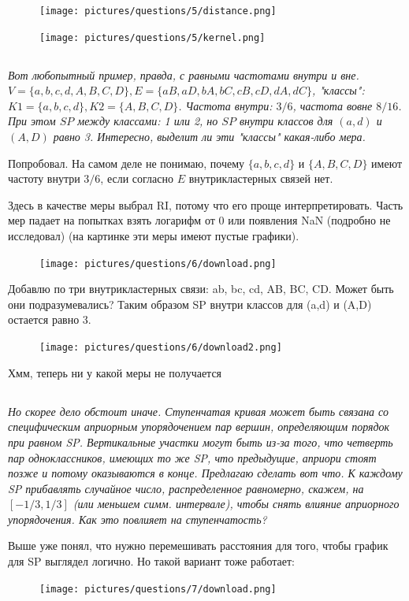 \documentclass{article}
\begin{document}
\begin{figure}[H] %
	\begin{minipage}{.5\textwidth}
		\centerline{
			\texttt{[image: pictures/questions/5/distance.png]}
		}
	\end{minipage}%
	\begin{minipage}{.5\textwidth}
		\centerline{
			\texttt{[image: pictures/questions/5/kernel.png]}
		}
	\end{minipage}%
\end{figure}

\subsection{}
\textit{Вот любопытный пример, правда, с равными частотами внутри и вне.  $V = \{a, b, c, d, A, B, C, D\}, E = \{aB, aD, bA, bC, cB, cD, dA, dC\}$, "классы": $K1 = \{a, b, c, d\}, K2 = \{A, B, C, D\}$. Частота внутри: $3/6$, частота вовне $8/16$. При этом $SP$ между классами: 1 или 2, но $SP$ внутри классов для $(a, d)$ и $(A, D)$ равно 3. Интересно, выделит ли эти "классы" какая-либо мера.}

Попробовал. На самом деле не понимаю, почему $\{a, b, c, d\}$ и $\{A, B, C, D\}$ имеют частоту внутри $3/6$, если согласно $E$ внутрикластерных связей нет. 

Здесь в качестве меры выбрал RI, потому что его проще интерпретировать. Часть мер падает на попытках взять логарифм от 0 или появления NaN (подробно не исследовал) (на картинке эти меры имеют пустые графики).

\begin{figure}[H]
	\texttt{[image: pictures/questions/6/download.png]}
\end{figure}

Добавлю по три внутрикластерных связи: ab, bc, cd, AB, BC, CD. Может быть они подразумевались? Таким образом SP внутри классов для (a,d) и (A,D) остается равно 3. 

\begin{figure}[H]
	\texttt{[image: pictures/questions/6/download2.png]}
\end{figure}

Хмм, теперь ни у какой меры не получается

\subsection{}
\textit{Но скорее дело обстоит иначе. Ступенчатая кривая может быть связана со специфическим априорным упорядочением пар вершин, определяющим порядок при равном SP. Вертикальные участки могут быть из-за того, что четверть пар одноклассников, имеющих то же SP, что предыдущие, априори стоят позже и потому оказываются в конце. Предлагаю сделать вот что. К каждому SP прибавлять случайное число, распределенное равномерно, скажем, на $[-1/3, 1/3]$ (или меньшем симм. интервале), чтобы снять влияние априорного упорядочения. Как это повлияет на ступенчатость?}

Выше уже понял, что нужно перемешивать расстояния для того, чтобы график для SP выглядел логично. Но такой вариант тоже работает:

\begin{figure}[H]
	\texttt{[image: pictures/questions/7/download.png]}
\end{figure}
\end{document}
